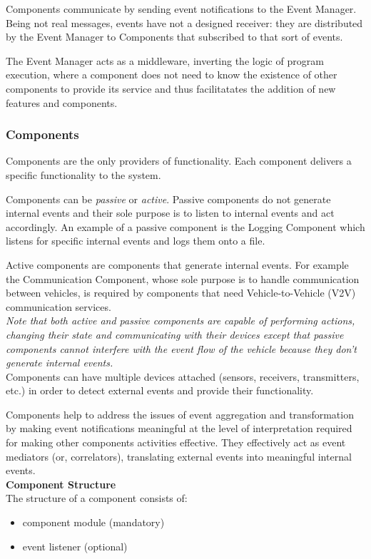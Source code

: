 \documentclass{memoir}
\begin{document}
Components communicate by sending event notifications to the Event Manager.
Being not real messages, events have not a designed receiver: they are distributed by the Event Manager to Components that subscribed to that sort of events.

The Event Manager acts as a middleware, inverting the logic of program execution, where a component does not need to know the existence of other components to provide its service and thus facilitatates the addition of new features and components.

\subsubsection{Components}

Components are the only providers of functionality. Each component delivers a specific functionality to the system.

Components can be \textit{passive} or \textit{active}. Passive components do not generate internal events and their sole purpose is to listen to internal events and act accordingly. An example of a passive component is the Logging Component which listens for specific internal events and logs them onto a file.

Active components are components that generate internal events. For example the Communication Component, whose sole purpose is to handle communication between vehicles, is required by components that need Vehicle-to-Vehicle (V2V) communication services.
\\

\textit{Note that both active and passive components are capable of performing actions, changing their state and communicating with their devices except that passive components cannot interfere with the event flow of the vehicle because they don't generate internal events.}
\\

Components can have multiple devices attached (sensors, receivers, transmitters, etc.) in order to detect external events and provide their functionality.

Components help to address the issues of event aggregation and transformation by making event notifications meaningful at the level of interpretation required for making other components activities effective. They effectively act as event mediators (or, correlators), translating external events into meaningful internal events.
\\
\newline
\textbf{Component Structure}
\\
\newline
The structure of a component consists of: 
\begin{itemize}
	\item component module (mandatory)
	\item event listener (optional)
\end{itemize}
\end{document}
